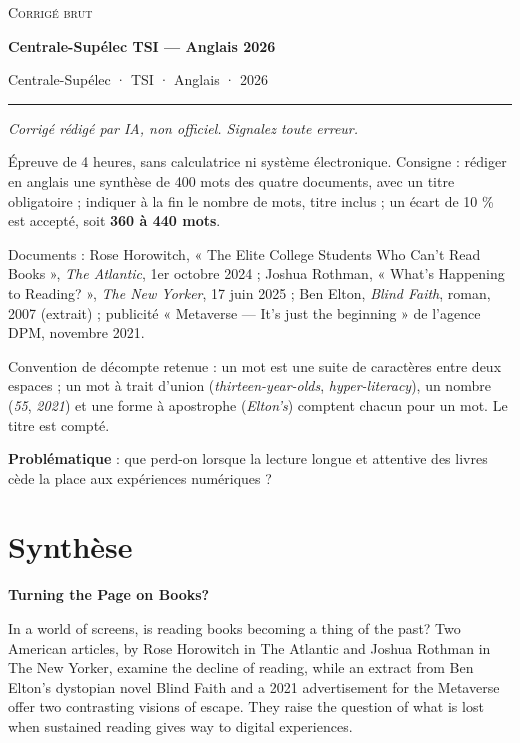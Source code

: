 \documentclass[11pt,a4paper]{article}
\begin{document}
\thispagestyle{plain}
\begin{center}
  {\small\scshape Corrigé brut}\par\smallskip
  {\LARGE\bfseries Centrale-Supélec TSI — Anglais 2026\par}\medskip
  {\large Centrale-Supélec · TSI · Anglais · 2026\par}
\end{center}
\vspace{2pt}\hrule\vspace{8pt}

\emph{Corrigé rédigé par IA, non officiel. Signalez toute erreur.}

Épreuve de 4 heures, sans calculatrice ni système électronique. Consigne : rédiger en anglais une synthèse de 400 mots des quatre documents, avec un titre obligatoire ; indiquer à la fin le nombre de mots, titre inclus ; un écart de 10 \% est accepté, soit \textbf{360 à 440 mots}.

Documents : Rose Horowitch, « The Elite College Students Who Can't Read Books », \emph{The Atlantic}, 1er octobre 2024 ; Joshua Rothman, « What's Happening to Reading? », \emph{The New Yorker}, 17 juin 2025 ; Ben Elton, \emph{Blind Faith}, roman, 2007 (extrait) ; publicité « Metaverse --- It's just the beginning » de l'agence DPM, novembre 2021.

Convention de décompte retenue : un mot est une suite de caractères entre deux espaces ; un mot à trait d'union (\emph{thirteen-year-olds}, \emph{hyper-literacy}), un nombre (\emph{55}, \emph{2021}) et une forme à apostrophe (\emph{Elton's}) comptent chacun pour un mot. Le titre est compté.

\textbf{Problématique} : que perd-on lorsque la lecture longue et attentive des livres cède la place aux expériences numériques ?

\hypertarget{synthuxe8se}{%
\section{Synthèse}\label{synthuxe8se}}

\textbf{Turning the Page on Books?}

In a world of screens, is reading books becoming a thing of the past? Two American articles, by Rose Horowitch in The Atlantic and Joshua Rothman in The New Yorker, examine the decline of reading, while an extract from Ben Elton's dystopian novel Blind Faith and a 2021 advertisement for the Metaverse offer two contrasting visions of escape. They raise the question of what is lost when sustained reading gives way to digital experiences.
\end{document}
